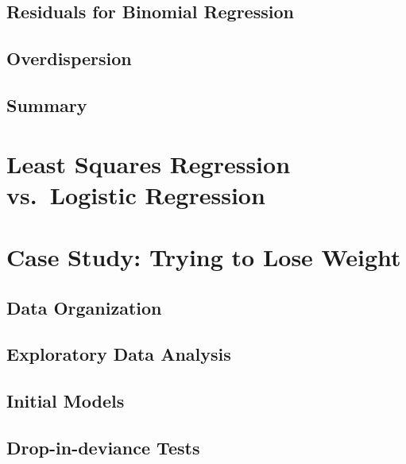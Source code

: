 \documentclass[
]{krantz}
\begin{document}
\hypertarget{residuals-for-binomial-regression}{%
\subsection{Residuals for Binomial Regression}\label{residuals-for-binomial-regression}}

\hypertarget{sec-logOverdispersion}{%
\subsection{Overdispersion}\label{sec-logOverdispersion}}

\hypertarget{summary-1}{%
\subsection{Summary}\label{summary-1}}

\hypertarget{least-squares-regression-vs.-logistic-regression}{%
\section{Least Squares Regression vs.~Logistic Regression}\label{least-squares-regression-vs.-logistic-regression}}

\hypertarget{case-study-trying-to-lose-weight}{%
\section{Case Study: Trying to Lose Weight}\label{case-study-trying-to-lose-weight}}

\hypertarget{data-organization-4}{%
\subsection{Data Organization}\label{data-organization-4}}

\hypertarget{exploratory-data-analysis-2}{%
\subsection{Exploratory Data Analysis}\label{exploratory-data-analysis-2}}

\hypertarget{initial-models-2}{%
\subsection{Initial Models}\label{initial-models-2}}

\hypertarget{drop-in-deviance-tests}{%
\subsection{Drop-in-deviance Tests}\label{drop-in-deviance-tests}}
\end{document}
